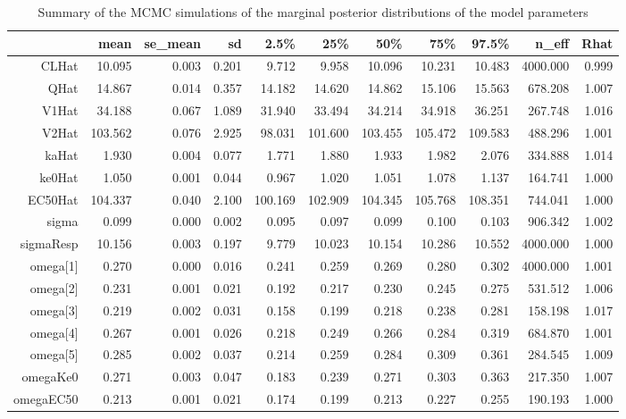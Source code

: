 \documentclass[11pt]{amsart}
\begin{document}
\begin{table}[ht]
\centering
\caption{Summary of the MCMC simulations of the marginal posterior distributions of the model parameters}
\begin{tabular}{rrrrrrrrrrr}
  \hline
 & mean & se\_mean & sd & 2.5\% & 25\% & 50\% & 75\% & 97.5\% & n\_eff & Rhat \\ 
  \hline
CLHat & 10.095 & 0.003 & 0.201 & 9.712 & 9.958 & 10.096 & 10.231 & 10.483 & 4000.000 & 0.999 \\
QHat & 14.867 & 0.014 & 0.357 & 14.182 & 14.620 & 14.862 & 15.106 & 15.563 & 678.208 & 1.007 \\
V1Hat & 34.188 & 0.067 & 1.089 & 31.940 & 33.494 & 34.214 & 34.918 & 36.251 & 267.748 & 1.016 \\
V2Hat & 103.562 & 0.076 & 2.925 & 98.031 & 101.600 & 103.455 & 105.472 & 109.583 & 488.296 & 1.001 \\
kaHat & 1.930 & 0.004 & 0.077 & 1.771 & 1.880 & 1.933 & 1.982 & 2.076 & 334.888 & 1.014 \\
ke0Hat & 1.050 & 0.001 & 0.044 & 0.967 & 1.020 & 1.051 & 1.078 & 1.137 & 164.741 & 1.000 \\
EC50Hat & 104.337 & 0.040 & 2.100 & 100.169 & 102.909 & 104.345 & 105.768 & 108.351 & 744.041 & 1.000 \\
sigma & 0.099 & 0.000 & 0.002 & 0.095 & 0.097 & 0.099 & 0.100 & 0.103 & 906.342 & 1.002 \\
sigmaResp & 10.156 & 0.003 & 0.197 & 9.779 & 10.023 & 10.154 & 10.286 & 10.552 & 4000.000 & 1.000 \\
omega[1] & 0.270 & 0.000 & 0.016 & 0.241 & 0.259 & 0.269 & 0.280 & 0.302 & 4000.000 & 1.001 \\
omega[2] & 0.231 & 0.001 & 0.021 & 0.192 & 0.217 & 0.230 & 0.245 & 0.275 & 531.512 & 1.006 \\
omega[3] & 0.219 & 0.002 & 0.031 & 0.158 & 0.199 & 0.218 & 0.238 & 0.281 & 158.198 & 1.017 \\
omega[4] & 0.267 & 0.001 & 0.026 & 0.218 & 0.249 & 0.266 & 0.284 & 0.319 & 684.870 & 1.001 \\
omega[5] & 0.285 & 0.002 & 0.037 & 0.214 & 0.259 & 0.284 & 0.309 & 0.361 & 284.545 & 1.009 \\
omegaKe0 & 0.271 & 0.003 & 0.047 & 0.183 & 0.239 & 0.271 & 0.303 & 0.363 & 217.350 & 1.007 \\
omegaEC50 & 0.213 & 0.001 & 0.021 & 0.174 & 0.199 & 0.213 & 0.227 & 0.255 & 190.193 & 1.000 \\
  \hline
\end{tabular}
\end{table}
\end{document}
